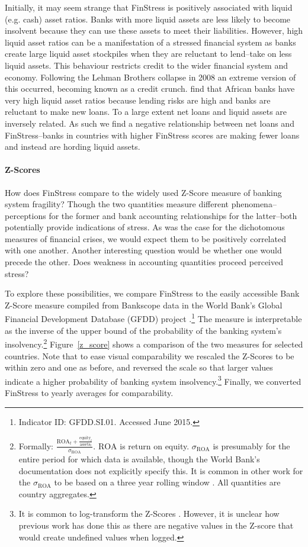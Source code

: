 \documentclass[]{article}
\begin{document}
Initially, it may seem strange that FinStress is positively associated with liquid (e.g. cash) asset ratios. Banks with more liquid assets are less likely to become insolvent because they can use these assets to meet their liabilities. However, high liquid asset ratios can be a manifestation of a stressed financial system as banks create large liquid asset stockpiles when they are reluctant to lend--take on less liquid assets. This behaviour restricts credit to the wider financial system and economy. Following the Lehman Brothers collapse in 2008 an extreme version of this occurred, becoming known as a credit crunch. \cite{Andrianova2014} find that African banks have very high liquid asset ratios because lending risks are high and banks are reluctant to make new loans. To a large extent net loans and liquid assets are inversely related. As such we find a negative relationship between net loans and FinStress--banks in countries with higher FinStress scores are making fewer loans and instead are hording liquid assets.

\paragraph{Z-Scores}

How does FinStress compare to the widely used Z-Score measure of banking system fragility? Though the two quantities measure different phenomena--perceptions for the former and bank accounting relationships for the latter--both potentially  provide indications of stress. As was the case for the dichotomous measures of financial crises, we would expect them to be positively correlated with one another. Another interesting question would be whether one would precede the other. Does weakness in accounting quantities proceed perceived stress?

To explore these possibilities, we compare FinStress to the easily accessible Bank Z-Score measure compiled from Bankscope data in the World Bank's Global Financial Development Database (GFDD) project \citep{worldbank2013}.\footnote{Indicator ID: GFDD.SI.01. Accessed June 2015.} The measure is interpretable as the inverse of the upper bound of the probability of the banking system's insolvency.\footnote{Formally: $\frac{\mathrm{ROA}_{t} + \frac{\mathrm{equity}_{t}}{\mathrm{assets}_{t}}}{\sigma_{\mathrm{ROA}}}$. $\mathrm{ROA}$ is return on equity. $\sigma_{\mathrm{ROA}}$ is presumably for the entire period for which data is available, though the World Bank's documentation does not explicitly specify this. It is common in other work for the $\sigma_{\mathrm{ROA}}$ to be based on a three year rolling window \cite[225]{beck2013bank}. All quantities are country aggregates.} Figure~\ref{z_score} shows a comparison of the two measures for selected countries. Note that to ease visual comparability we rescaled the Z-Scores to be within zero and one as before, and reversed the scale so that larger values indicate a higher probability of banking system insolvency.\footnote{It is common to log-transform the Z-Scores \cite[225]{beck2013bank}. However, it is unclear how previous work has done this as there are negative values in the Z-score that would create undefined values when logged.} Finally, we converted FinStress to yearly averages for comparability.
\end{document}
